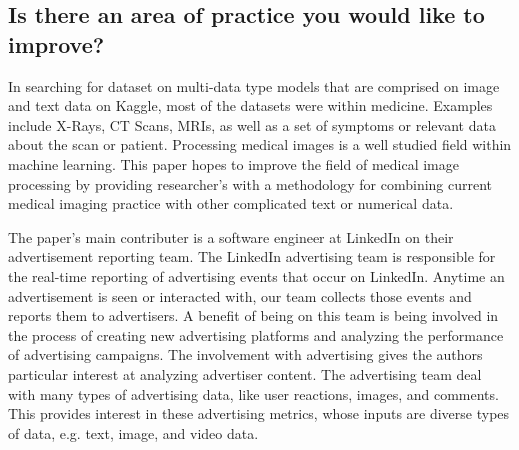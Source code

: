 \subsection{Is there an area of practice you would like to improve?}

In searching for dataset on multi-data type models that are comprised on image and text data on Kaggle, most of the datasets were within medicine.  Examples include X-Rays, CT Scans, MRIs, as well as a set of symptoms or relevant data about the scan or patient.  Processing medical images is a well studied field within machine learning.  This paper hopes to improve the field of medical image processing by providing researcher's with a methodology for combining current medical imaging practice with other complicated text or numerical data.

The paper's main contributer is a software engineer at LinkedIn on their advertisement reporting team.  The LinkedIn advertising team is responsible for the real-time reporting of advertising events that occur on LinkedIn.  Anytime an advertisement is seen or interacted with, our team collects those events and reports them to advertisers.  A benefit of being on this team is being involved in the process of creating new advertising platforms and analyzing the performance of advertising campaigns.  The involvement with advertising gives the authors particular interest at analyzing advertiser content.  The advertising team deal with many types of advertising data, like user reactions, images, and comments. This provides interest in these advertising metrics, whose inputs are diverse types of data, e.g. text, image, and video data.


